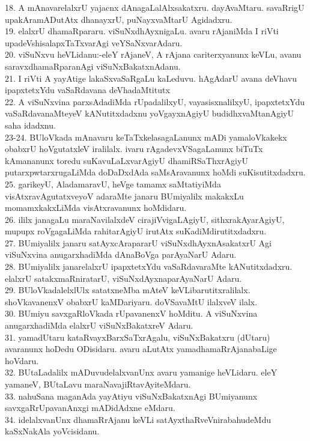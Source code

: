 \documentclass{article}
\begin{document}
18. A mAnavarelalxrU yajacnx dAnagaLalAlxsakatxru. dayAvaMtaru. savaRrigU upakAramADutAtx dhanayxrU, puNayxvaMtarU Agidadxru.\\
19. elalxrU dhamaRpararu. viSuNxdhAyxnigaLu. avaru rAjaniMda I riVti upadeVshisalapxTaTxvarAgi veYSaNxvarAdaru.\\
20. viSuNxvu heVLidanu:-eleY rAjaneV, A rAjana cariterxyanunx keVLu, avanu saravxdhamaRparanAgi viSuNxBakatxnAdanu.\\
21. I riVti A yayAtige lakaSxvaSaRgaLu kaLeduvu. hAgAdarU avana deVhavu ipapxtetxYdu vaSaRdavana deVhadaMtitutx\\
22. A viSuNxvina parxsAdadiMda rUpadalilxyU, vayasisxnalilxyU, ipapxtetxYdu vaSaRdavanaMteyeV kANutitxdadxnu yoVgayxnAgiyU budidhxvaMtanAgiyU saha idadxnu.\\
23-24. BUloVkada mAnavaru keTaTxkelasagaLanunx mADi yamaloVkakekx obabxrU hoVgutatxleV iralilalx. ivaru rAgadevxVSagaLanunx biTuTx kAmananunx toredu suKavuLaLxvarAgiyU dhamiRSaThxrAgiyU putarxpwtarxrugaLiMda doDaDxdAda saMsAravanunx hoMdi suKisutitxdadxru.\\
25. garikeyU, AladamaravU, heVge tamamx saMtatiyiMda visAtxravAgutatxveyoV adaraMte janaru BUmiyalilx makakxLu momamxkakxLiMda visAtxravanunx hoMdidaru.\\
26. ililx janagaLu maraNavilalxdeV cirajiVvigaLAgiyU, sithxrakAyarAgiyU, mupupx roVgagaLiMda rahitarAgiyU irutAtx suKadiMdirutitxdadxru.\\
27. BUmiyalilx janaru satAyxcArapararU viSuNxdhAyxnAsakatxrU Agi viSuNxvina anugarxhadiMda dAnaBoVga parAyaNarU Adaru.\\
28. BUmiyalilx janarelalxrU ipapxtetxYdu vaSaRdavaraMte kANutitxdadxru. elalxrU satakxmaRniratarU, viSuNxdAyxnaparAyaNarU Adaru.\\
29. BUloVkadalelxlUlx satatxneMba mAteV keVLibarutitxralilalx. shoVkavanenxV obabxrU kaMDariyaru. doVSavaMtU ilalxveV ilalx.\\
30. BUmiyu savxgaRloVkada rUpavanenxV hoMditu. A viSuNxvina anugarxhadiMda elalxrU viSuNxBakatxreV Adaru.\\
31. yamadUtaru kataRvayxBarxSaTxrAgalu, viSuNxBakatxru (dUtaru) avaranunx hoDedu ODisidaru. avaru aLutAtx yamadhamaRrAjanabaLige hoVdaru.\\
32. BUtaLadalilx mADuvudelalxvanUnx avaru yamanige heVLidaru. eleY yamaneV, BUtaLavu maraNavajiRtavAyiteMdaru.\\
33. nahuSana maganAda yayAtiyu viSuNxBakatxnAgi BUmiyanunx savxgaRrUpavanAnxgi mADidAdxne eMdaru.\\
34. idelalxvanUnx dhamaRrAjanu keVLi satAyxthaRveVnirabahudeMdu kaSxNakAla yoVcisidanu.\\
\end{document}

